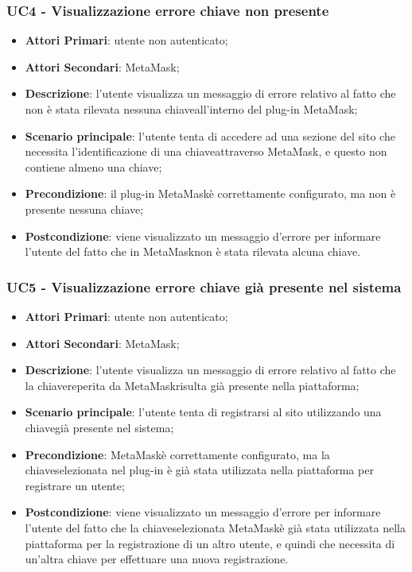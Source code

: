 \subsubsection{UC4 - Visualizzazione errore chiave non 
	presente}
\begin{itemize}
	\item \textbf{Attori Primari}: utente non autenticato;
	\item \textbf{Attori Secondari}: MetaMask\glo;
	\item \textbf{Descrizione}:
	l'utente visualizza un messaggio di errore relativo al fatto che non è stata rilevata nessuna chiave\glosp all'interno del plug-in MetaMask\glo;
	\item \textbf{Scenario principale}: l'utente tenta di accedere ad una sezione del sito che necessita l'identificazione di una chiave\glosp attraverso MetaMask\glo, e questo non contiene almeno una chiave\glo;
	\item \textbf{Precondizione}: il plug-in MetaMask\glosp è correttamente configurato, ma non è presente nessuna chiave\glo;
	\item \textbf{Postcondizione}: viene visualizzato un messaggio d'errore per informare l'utente del fatto che in MetaMask\glosp non è stata rilevata alcuna chiave\glo.
	
\end{itemize}

\subsubsection{UC5 - Visualizzazione errore chiave già presente nel sistema}
\begin{itemize}
	\item \textbf{Attori Primari}: utente non autenticato;
	\item \textbf{Attori Secondari}: MetaMask\glo;
	\item \textbf{Descrizione}:
	l'utente visualizza un messaggio di errore relativo al fatto che la chiave\glosp reperita da MetaMask\glosp risulta già presente nella piattaforma;
	\item \textbf{Scenario principale}: l'utente tenta di registrarsi al sito utilizzando una chiave\glosp già presente nel sistema;
	\item \textbf{Precondizione}: MetaMask\glosp è correttamente configurato, ma la chiave\glosp selezionata nel plug-in è già stata utilizzata nella piattaforma per registrare un utente;
	\item \textbf{Postcondizione}: viene visualizzato un messaggio d'errore per informare l'utente del fatto che la chiave\glosp selezionata MetaMask\glosp è già stata utilizzata nella piattaforma per la registrazione di un altro utente, e quindi che necessita di un'altra chiave per effettuare una nuova registrazione.
\end{itemize}

